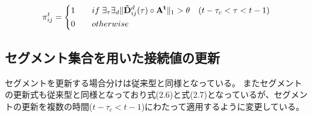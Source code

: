 \begin{equation}
  \pi^t_{ij} =
  \left\{
  \begin{alignedat}{2}
    1 \qquad &if \; \exists_\tau \exists_d\|{\bf \tilde{D}}^d_{ij}(\tau) \circ {\bf A^t}\|_1 > \theta \quad (t-\tau_c < \tau < t-1)\\
    0 \qquad &otherwise
  \end{alignedat}
  \right.
\end{equation}

\subsection{セグメント集合を用いた接続値の更新}
セグメントを更新する場合分けは従来型と同様となっている。
またセグメントの更新式も従来型と同様となっており式(2.6)と式(2.7)となっているが、セグメントの更新を複数の時間($t-\tau_c < t-1$)にわたって適用するように変更している。
